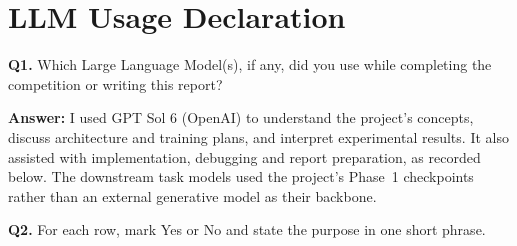 \section*{LLM Usage Declaration}

\noindent\textbf{Q1.} Which Large Language Model(s), if any, did you use while completing the competition or writing this report?

\noindent\textbf{Answer:} I used GPT Sol 6 (OpenAI) to understand the project's concepts, discuss architecture and training plans, and interpret experimental results. It also assisted with implementation, debugging and report preparation, as recorded below. The downstream task models used the project's Phase~1 checkpoints rather than an external generative model as their backbone.

\medskip
\noindent\textbf{Q2.} For each row, mark Yes or No and state the purpose in one short phrase.

